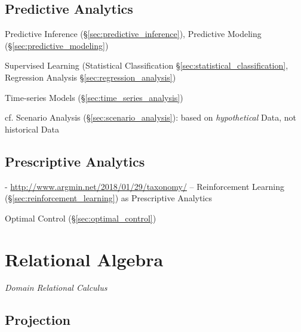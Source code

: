 \subsection{Predictive Analytics}\label{sec:predictive_analytics}

Predictive Inference (\S\ref{sec:predictive_inference}), Predictive Modeling
(\S\ref{sec:predictive_modeling})

\fist Supervised Learning (Statistical Classification
\S\ref{sec:statistical_classification}, Regression Analysis
\S\ref{sec:regression_analysis})

Time-series Models (\S\ref{sec:time_series_analysis})

cf. Scenario Analysis (\S\ref{sec:scenario_analysis}): based on
\emph{hypothetical} Data, not historical Data



\subsection{Prescriptive Analytics}\label{sec:prescriptive_analytics}

- \url{http://www.argmin.net/2018/01/29/taxonomy/} -- Reinforcement Learning
(\S\ref{sec:reinforcement_learning}) as Prescriptive Analytics

\fist Optimal Control (\S\ref{sec:optimal_control})



\section{Relational Algebra}\label{sec:relational_algebra}

\emph{Domain Relational Calculus}



\subsection{Projection}\label{sec:relational_projection}



